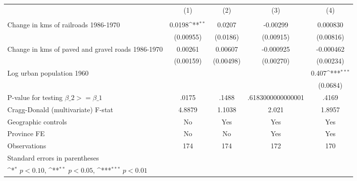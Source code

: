 {
\def\sym#1{\ifmmode^{#1}\else\(^{#1}\)\fi}
\begin{tabular}{l*{4}{c}}
\hline\hline
                &\multicolumn{1}{c}{(1)}&\multicolumn{1}{c}{(2)}&\multicolumn{1}{c}{(3)}&\multicolumn{1}{c}{(4)}\\
                &\multicolumn{1}{c}{}&\multicolumn{1}{c}{}&\multicolumn{1}{c}{}&\multicolumn{1}{c}{}\\
\hline
Change in kms of railroads 1986-1970&   0.0198\sym{**} &   0.0207         & -0.00299         & 0.000830         \\
                &(0.00955)         & (0.0186)         &(0.00915)         &(0.00816)         \\
[1em]
Change in kms of paved and gravel roads 1986-1970&  0.00261         &  0.00607         &-0.000925         &-0.000462         \\
                &(0.00159)         &(0.00498)         &(0.00270)         &(0.00234)         \\
[1em]
Log urban population 1960&                  &                  &                  &    0.407\sym{***}\\
                &                  &                  &                  & (0.0684)         \\
\hline
P-value for testing $\beta\_{2} >= \beta\_{1}$&    .0175         &    .1488         &.6183000000000001         &    .4169         \\
Cragg-Donald (multivariate) F-stat&   4.8879         &   1.1038         &    2.021         &   1.8957         \\
Geographic controls&       No         &      Yes         &      Yes         &      Yes         \\
Province FE     &       No         &       No         &      Yes         &      Yes         \\
Observations    &      174         &      174         &      172         &      170         \\
\hline\hline
\multicolumn{5}{l}{\footnotesize Standard errors in parentheses}\\
\multicolumn{5}{l}{\footnotesize \sym{*} \(p<0.10\), \sym{**} \(p<0.05\), \sym{***} \(p<0.01\)}\\
\end{tabular}
}
